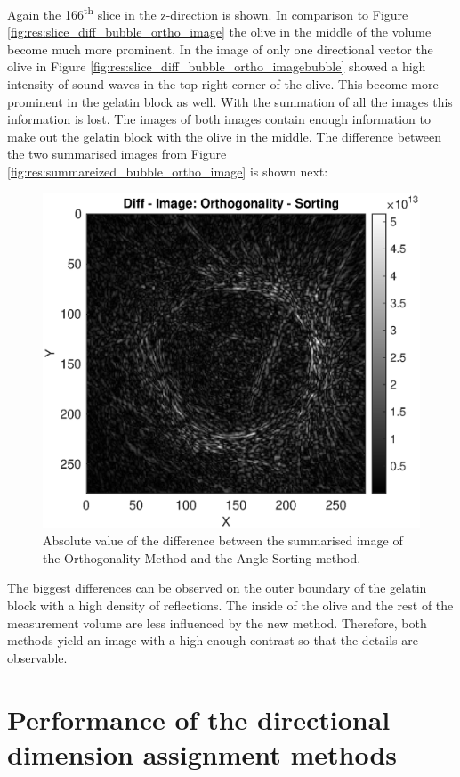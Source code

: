 Again the 166\textsuperscript{th} slice in the z-direction is shown. In comparison to Figure \ref{fig:res:slice_diff_bubble_ortho_image} the olive in the middle of the volume become much more prominent. In the image of only one directional vector the olive in Figure \ref{fig:res:slice_diff_bubble_ortho_imagebubble} showed a high intensity of sound waves in the top right corner of the olive. This become more prominent in the gelatin block as well. With the summation of all the images this information is lost. The images of both images contain enough information to make out the gelatin block with the olive in the middle. The difference between the two summarised images from Figure \ref{fig:res:summareized_bubble_ortho_image} is shown next:

\begin{figure}[H]
    \centering
    \includegraphics[width=0.82\linewidth]{Graphics/Results/Diff_angle_sort_orthogonality/diff_ortho_bubble_diffimage.eps}
    \caption{Absolute value of the difference between the summarised image of the Orthogonality Method and the Angle Sorting method. }
    \label{fig:diff_image}
\end{figure}

The biggest differences can be observed on the outer boundary of the gelatin block with a high density of reflections. The inside of the olive and the rest of the measurement volume are less influenced by the new method. Therefore, both methods yield an image with a high enough contrast so that the details are observable.





\section{Performance of the directional dimension assignment methods}
\label{performance_index_ident}

